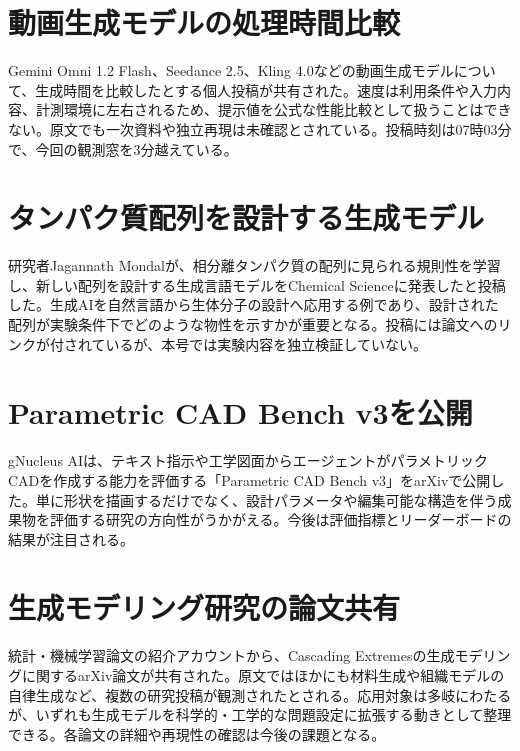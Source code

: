 \section{動画生成モデルの処理時間比較}
Gemini Omni 1.2 Flash、Seedance 2.5、Kling 4.0などの動画生成モデルについて、生成時間を比較したとする個人投稿が共有された。速度は利用条件や入力内容、計測環境に左右されるため、提示値を公式な性能比較として扱うことはできない。原文でも一次資料や独立再現は未確認とされている。投稿時刻は07時03分で、今回の観測窓を3分越えている。

\section{タンパク質配列を設計する生成モデル}
研究者Jagannath Mondalが、相分離タンパク質の配列に見られる規則性を学習し、新しい配列を設計する生成言語モデルをChemical Scienceに発表したと投稿した。生成AIを自然言語から生体分子の設計へ応用する例であり、設計された配列が実験条件下でどのような物性を示すかが重要となる。投稿には論文へのリンクが付されているが、本号では実験内容を独立検証していない。

\section{Parametric CAD Bench v3を公開}
gNucleus AIは、テキスト指示や工学図面からエージェントがパラメトリックCADを作成する能力を評価する「Parametric CAD Bench v3」をarXivで公開した。単に形状を描画するだけでなく、設計パラメータや編集可能な構造を伴う成果物を評価する研究の方向性がうかがえる。今後は評価指標とリーダーボードの結果が注目される。

\section{生成モデリング研究の論文共有}
統計・機械学習論文の紹介アカウントから、Cascading Extremesの生成モデリングに関するarXiv論文が共有された。原文ではほかにも材料生成や組織モデルの自律生成など、複数の研究投稿が観測されたとされる。応用対象は多岐にわたるが、いずれも生成モデルを科学的・工学的な問題設定に拡張する動きとして整理できる。各論文の詳細や再現性の確認は今後の課題となる。

